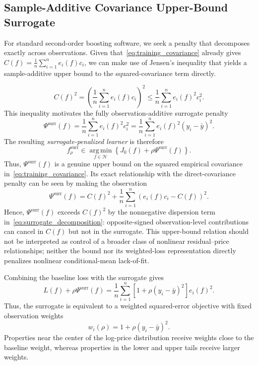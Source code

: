 \documentclass[10pt]{article}
\theoremstyle{definition}
\newcommand{\1}{\mathbf{1}}
\newcommand{\Hcal}{\mathcal{H}}
\newcommand{\argminop}{\operatorname*{arg\,min}}
\begin{document}
\subsection{{Sample-Additive Covariance Upper-Bound Surrogate}}
\label{subsec:surrogate}


{For standard second-order boosting software, we seek a penalty that decomposes exactly across observations. Given that~\eqref{eq:training_covariance} already gives $C(f)=\frac{1}{n}\sum_{i=1}^n e_i(f)c_i$, we can make use of Jensen's inequality that yields a sample-additive upper bound to the squared-covariance term directly.}


{
\begin{equation}
\label{eq:surrogate_upper_bound}
C(f)^2
=
\left(
\frac{1}{n}\sum_{i=1}^n e_i(f)c_i
\right)^2
\leq
\frac{1}{n}\sum_{i=1}^n e_i(f)^2c_i^2.
\end{equation}
}
{This inequality motivates the fully observation-additive surrogate penalty}
\begin{equation}
\label{eq:surrogate}
\Psi^{\mathrm{surr}}(f)
=
\frac{1}{n}\sum_{i=1}^n e_i(f)^2c_i^2
=
\frac{1}{n}\sum_{i=1}^n
e_i(f)^2(y_i-\bar y)^2.
\end{equation}
The resulting \emph{surrogate-penalized learner} is therefore
\begin{equation}
\label{eq:surrogate_learning}
f_\rho^{\mathrm{surr}}
\in
\argminop_{f\in\Hcal}
\left\{
{J_0(f)}
+
\rho\Psi^{\mathrm{surr}}(f)
\right\}.
\end{equation}
{
Thus, $\Psi^{\mathrm{surr}}(f)$ is a genuine upper bound on the squared empirical covariance in~\eqref{eq:training_covariance}. Its exact relationship with the direct-covariance penalty can be seen by making the observation
\begin{equation}
\label{eq:surrogate_decomposition}
\Psi^{\mathrm{surr}}(f)
=
C(f)^2
+
\frac{1}{n}
\sum_{i=1}^n
\left(e_i(f)c_i-C(f)\right)^2.
\end{equation}
Hence, $\Psi^{\mathrm{surr}}(f)$ exceeds $C(f)^2$ by the nonnegative dispersion term in~\eqref{eq:surrogate_decomposition}: opposite-signed observation-level contributions can cancel in $C(f)$ but not in the surrogate. This upper-bound relation should not be interpreted as control of a broader class of nonlinear residual--price relationships; neither the bound nor its weighted-loss representation directly penalizes nonlinear conditional-mean lack-of-fit.
}


Combining the baseline loss with the surrogate gives
\begin{equation}
\label{eq:surrogate_weighted_loss}
L(f)+\rho\Psi^{\mathrm{surr}}(f)
=
\frac{1}{n}\sum_{i=1}^n
\left[1+\rho(y_i-\bar y)^2\right]e_i(f)^2.
\end{equation}
Thus, the surrogate is equivalent to a weighted squared-error objective with fixed observation weights
\begin{equation}
\label{eq:surrogate_weights}
w_i(\rho)=1+\rho(y_i-\bar y)^2.
\end{equation}
Properties near the center of the log-price distribution receive weights close to the baseline weight, whereas properties in the lower and upper tails receive larger weights.
\end{document}
